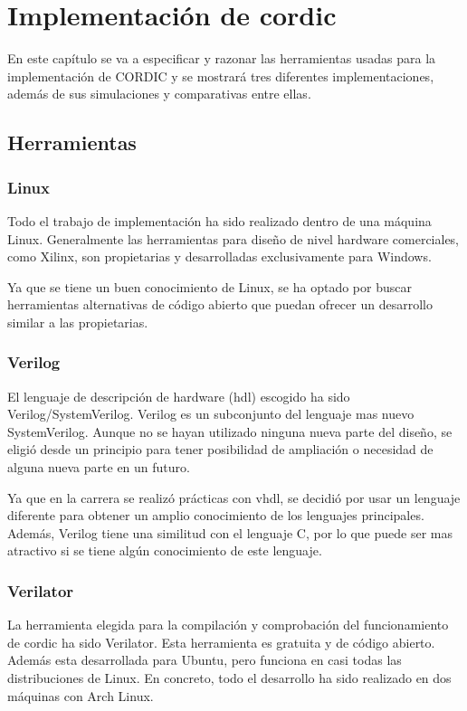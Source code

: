 \chapter{Implementación de \gls{cordic}}
En este capítulo se va a especificar y razonar las herramientas usadas para la implementación de CORDIC y se mostrará tres diferentes implementaciones, además de sus simulaciones y comparativas entre ellas.

\section{Herramientas}
\subsection{Linux}
Todo el trabajo de implementación ha sido realizado dentro de una máquina Linux. Generalmente las herramientas para diseño de nivel hardware comerciales, como Xilinx, son propietarias y desarrolladas exclusivamente para Windows.

Ya que se tiene un buen conocimiento de Linux, se ha optado por buscar herramientas alternativas de código abierto que puedan ofrecer un desarrollo similar a las propietarias.
\subsection{Verilog}
El lenguaje de descripción de hardware (\gls{hdl}) escogido ha sido Verilog/SystemVerilog. Verilog es un subconjunto del lenguaje mas nuevo SystemVerilog. Aunque no se hayan utilizado ninguna nueva parte del diseño, se eligió desde un principio para tener posibilidad de ampliación o necesidad de alguna nueva parte en un futuro.

Ya que en la carrera se realizó prácticas con \gls{vhdl}, se decidió por usar un lenguaje diferente para obtener un amplio conocimiento de los lenguajes principales. Además, Verilog tiene una similitud con el lenguaje C, por lo que puede ser mas atractivo si se tiene algún conocimiento de este lenguaje.

\subsection{Verilator}
La herramienta elegida para la compilación y comprobación del funcionamiento de \gls{cordic} ha sido Verilator. Esta herramienta es gratuita y de código abierto. Además esta desarrollada para Ubuntu, pero funciona en casi todas las distribuciones de Linux. En concreto, todo el desarrollo ha sido realizado en dos máquinas con Arch Linux.

